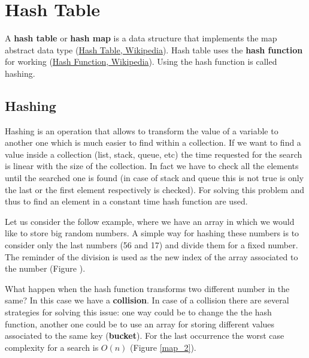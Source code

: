 \section{Hash Table}
A \textbf{hash table} or \textbf{hash map} is a data structure that implements the map abstract data type \cite{wikihashtable} (\href{https://en.wikipedia.org/wiki/Hash_table}{Hash Table, Wikipedia}). Hash table uses the \textbf{hash function} for working \cite{wikihashfunction} (\href{https://en.wikipedia.org/wiki/Hash_function}{Hash Function, Wikipedia}). Using the hash function is called hashing.

\subsection{Hashing}
Hashing is an operation that allows to transform the value of a variable to another one which is much easier to find within a collection. If we want to find a value inside a collection (list, stack, queue, etc) the time requested for the search is linear with the size of the collection. In fact we have to check all the elements until the searched one is found (in case of stack and queue this is not true is only the last or the first element respectively is checked). For solving this problem and thus to find an element in a constant time hash function are used. 

Let us consider the follow example, where we have an array in which we would like to store big random numbers. A simple way for hashing these numbers is to consider only the last numbers (56 and 17) and divide them for a fixed number. The reminder of the division is used as the new index of the array associated to the number (Figure ).

What happen when the hash function transforms two different number in the same? In this case we have a \textbf{collision}. In case of a collision there are several strategies for solving this issue: one way could be to change the the hash function, another one could be to use an array for storing different values associated to the same key (\textbf{bucket}). For the last occurrence the worst case complexity for a search is \(O(n)\) (Figure \ref{map_2}).

